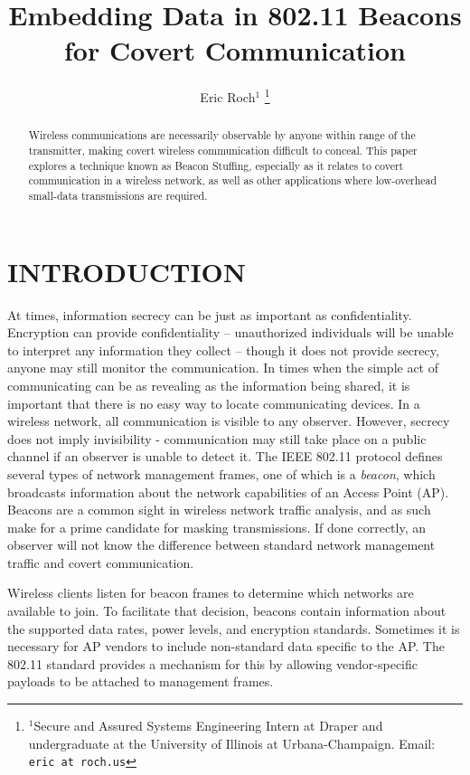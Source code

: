 \documentclass[letterpaper, 10 pt, conference]{ieeeconf}  %
\title{\LARGE \bf
Embedding Data in 802.11 Beacons for Covert Communication
}
\author{Eric Roch$^{1}$%
\thanks{$^{1}$Secure and Assured Systems Engineering Intern at Draper 
		and undergraduate at the University of Illinois at Urbana-Champaign. Email:
        {\tt\small eric at roch.us}}%
}
\begin{document}
\maketitle
\thispagestyle{empty}
\pagestyle{empty}


\begin{abstract}

Wireless communications are necessarily observable by anyone within range of the transmitter, making covert wireless communication difficult to conceal.  This paper explores a technique known as Beacon Stuffing, especially as it relates to covert communication in a wireless network, as well as other applications where low-overhead small-data transmissions are required.

\end{abstract}


\section{INTRODUCTION}

At times, information secrecy can be just as important as confidentiality.  Encryption can provide confidentiality -- unauthorized individuals will be unable to interpret any information they collect -- though it does not provide secrecy, anyone may still monitor the communication.  In times when the simple act of communicating can be as revealing as the information being shared, it is important that there is no easy way to locate communicating devices.  In a wireless network, all communication is visible to any observer.  However, secrecy does not imply invisibility - communication may still take place on a public channel if an observer is unable to detect it.  The IEEE 802.11 protocol defines several types of network management frames, one of which is a \textit{beacon}, which broadcasts information about the network capabilities of an Access Point (AP).  Beacons are a common sight in wireless network traffic analysis, and as such make for a prime candidate for masking transmissions.  If done correctly, an observer will not know the difference between standard network management traffic and covert communication.

Wireless clients listen for beacon frames to determine which networks are available to join.  To facilitate that decision, beacons contain information about the supported data rates, power levels, and encryption standards. Sometimes it is necessary for AP vendors to include non-standard data specific to the AP.  The 802.11 standard provides a mechanism for this by allowing vendor-specific payloads to be attached to management frames. 
\end{document}
